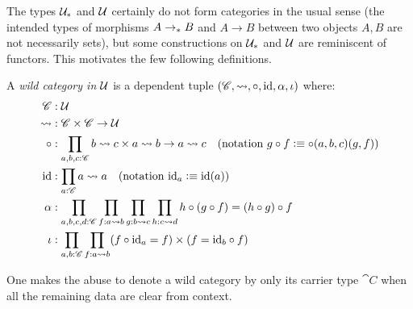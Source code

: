 \documentclass[english,a4paper]{lmcs}
\begin{document}

\label{sec:wild-functors}
\def\hom(#1,#2){#1 \rightsquigarrow #2}
%
The types $\mathcal{U}_*$ and $\mathcal{U}$ certainly do not form categories in the usual
sense (the intended types of morphisms $A \to_\ast B$ and $A\to B$ between two
objects $A,B$ are not necessarily sets), but some constructions on $\mathcal{U}_*$ and $\mathcal{U}$ are
reminiscent of functors. This motivates the few following definitions.

\begin{defi}
  A \emph{wild category in} $\mathcal{U}$ is a dependent tuple $(\cat C, \hom( , ), \circ, \id, \alpha,
  \iota)$ where:
  \begin{align*}
    \cat C&: \UU \\
    \hom( , )&: \cat C \times \cat C \to \UU \\
    \circ&: \prod_{a,b,c:\cat C} \hom(b,c) \times \hom(a,b) \to \hom(a,c)
    \quad (\text{notation}\ g\circ f \defequi \circ(a,b,c)(g,f)) \\
    \id&: \prod_{a:\cat C} \hom(a,a) \quad (\text{notation}\ \id_a \defequi \id(a)) \\
    \alpha&: \prod_{a,b,c,d:\cat C} \prod_{f:\hom(a,b)} \prod_{g:\hom(b,c)} \prod_{h:\hom(c,d)}
    h\circ (g \circ f) = (h \circ g) \circ f \\
    \iota&: \prod_{a,b:\cat C} \prod_{f:\hom(a,b)} (f\circ \id_a = f) \times (f = \id_b \circ f)
  \end{align*}
  \label{defn:wild-cat}
\end{defi}
One makes the abuse to denote a wild category by only its carrier type $\cat C$ when
all the remaining data are clear from context.
\end{document}

